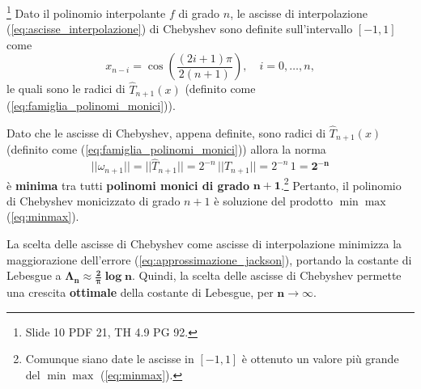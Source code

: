 \begin{definition}\footnote{Slide 10 PDF 21, TH 4.9 PG 92.}
    Dato il polinomio interpolante $f$ di grado $n$, le ascisse di interpolazione (\ref{eq:ascisse_interpolazione}) di Chebyshev sono definite sull'intervallo $[-1, 1]$ come
    \begin{equation}\label{eq:ascisse_chebyshev}
        x_{n-i}=\cos{\left(\frac{(2i+1)\pi}{2(n+1)}\right)},\quad i=0,\hdots,n,
    \end{equation}
    le quali sono le radici di $\widehat T_{n+1}(x)$ (definito come (\ref{eq:famiglia_polinomi_monici})).
\end{definition}

Dato che le ascisse di Chebyshev, appena definite, sono radici di $\widehat T_{n+1}(x)$ (definito come (\ref{eq:famiglia_polinomi_monici})) allora la norma
\begin{equation*}
    ||\omega_{n+1}||=||\widehat T_{n+1}||=2^{-n}\,||T_{n+1}||=2^{-n}\, 1 = \boldsymbol{2^{-n}}
\end{equation*}
è \textbf{minima} tra tutti \textbf{polinomi monici di grado} $\boldsymbol{n+1}$.\footnote{Comunque siano date le ascisse in $[-1,1]$ è ottenuto un valore più grande del $\min\max$ (\ref{eq:minmax}).} Pertanto, il polinomio di Chebyshev monicizzato di grado $n+1$ è soluzione del prodotto $\min\max$ (\ref{eq:minmax}). 

\begin{remark}
	La scelta delle ascisse di Chebyshev come ascisse di interpolazione minimizza la maggiorazione dell'errore (\ref{eq:approssimazione_jackson}), portando la costante di Lebesgue a $\boldsymbol{\Lambda_n\approx\frac{2}{\pi}\log n}$. Quindi, la scelta delle ascisse di Chebyshev permette una crescita \textbf{ottimale} della costante di Lebesgue, per $\boldsymbol{n\rightarrow\infty}$.
\end{remark}

